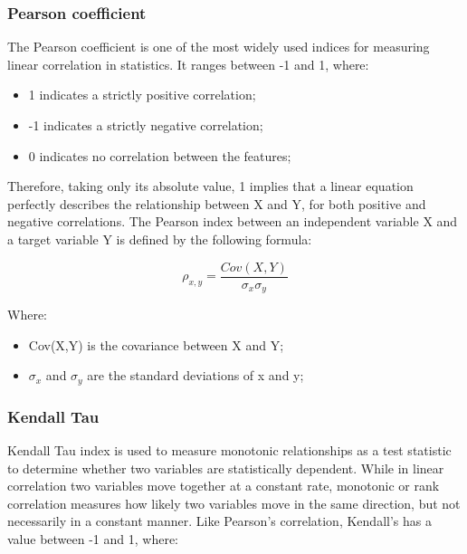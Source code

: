 \subsubsection{Pearson coefficient}
The Pearson coefficient is one of the most widely used indices for measuring linear correlation in statistics. It ranges between -1 and 1, where:
\begin{itemize}
\item 1 indicates a strictly positive correlation;
\item -1 indicates a strictly negative correlation;
\item0 indicates no correlation between the features;
\end{itemize}

Therefore, taking only its absolute value, 1 implies that a linear equation perfectly describes the relationship between X and Y, for both positive and negative correlations. \newline
The Pearson index between an independent variable X and a target variable Y is defined by the following formula:

\begin{equation}
  \rho_{x,y} = \frac{Cov(X,Y)}{\sigma_x\sigma_y}
 \end{equation}

  Where:
  \begin{itemize}
      \item Cov(X,Y) is the covariance between X and Y;
      \item $\sigma_x$ and $\sigma_y$ are the standard deviations of x and y;
  \end{itemize}
  



\subsubsection{Kendall Tau}
Kendall Tau index is used to measure monotonic relationships as a test statistic to determine whether two variables are statistically dependent. \newline
While in linear correlation two variables move together at a constant rate, monotonic or rank correlation measures how likely two variables move in the same direction, but not necessarily in a constant manner. \newline
Like Pearson’s correlation, Kendall’s has a value between -1 and 1, where:

